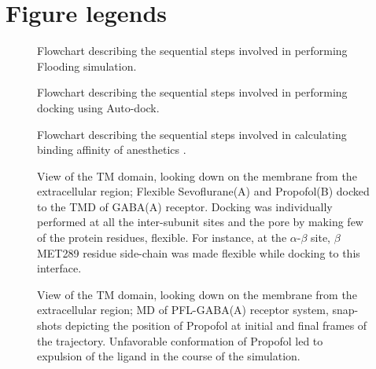 \documentclass[12pt]{article}
\begin{document}




\section*{Figure legends}

\begin{figure}
\begin{center}
\centering
\caption{Flowchart describing  the sequential steps involved in performing Flooding simulation.}
\label{fig:flowchart_flood}
\end{center}
\end{figure}

\begin{figure}
\begin{center}
\centering
\caption{Flowchart describing  the sequential steps involved in performing docking using Auto-dock.}
\label{fig:flowchart_dock}
\end{center}
\end{figure}

\begin{figure}
\begin{center}
\centering
\caption{Flowchart describing  the sequential steps involved in calculating binding affinity of anesthetics .}
\label{fig:flowchart_FEP}
\end{center}
\end{figure}

\begin{figure}
\begin{center}
\centering
\caption{View of the TM domain, looking down on the membrane from the extracellular region; Flexible Sevoflurane(A) and Propofol(B) docked to the TMD of GABA(A) receptor. Docking was individually performed at all the inter-subunit sites and the pore by making few of the protein residues, flexible. For instance, at the $\alpha$-$\beta$ site, $\beta$MET289 residue side-chain was made flexible  while docking to this interface.}
\label{fig:dockPic}
\end{center}
\end{figure}

\begin{figure}
\begin{center}
\centering
\caption{View of the TM domain, looking down on the membrane from the extracellular region;   MD  of  PFL-GABA(A)  receptor  system,  snap-shots depicting the position of Propofol at initial and final frames of the trajectory.  Unfavorable conformation of Propofol led to expulsion of the ligand in the course of the simulation.}
\label{fig:PFLequl}
\end{center}
\end{figure}
\end{document}
